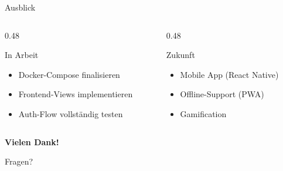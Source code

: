\documentclass[aspectratio=169,11pt]{beamer}
\begin{document}
\begin{frame}{Ausblick}
  \begin{columns}[T]
    \begin{column}{0.48\textwidth}
      \begin{block}{In Arbeit}
        \begin{itemize}
          \item Docker-Compose finalisieren
          \item Frontend-Views implementieren
          \item Auth-Flow vollständig testen
        \end{itemize}
      \end{block}
    \end{column}
    \begin{column}{0.48\textwidth}
      \begin{block}{Zukunft}
        \begin{itemize}
          \item Mobile App (React Native)
          \item Offline-Support (PWA)
          \item Gamification
        \end{itemize}
      \end{block}
    \end{column}
  \end{columns}
\end{frame}

\begin{frame}[plain]
  \centering
  \vfill
  {\Large\textbf{Vielen Dank!}}

  \vspace{12pt}
  {\color{graytext} Fragen?}
  \vfill
\end{frame}
\end{document}
